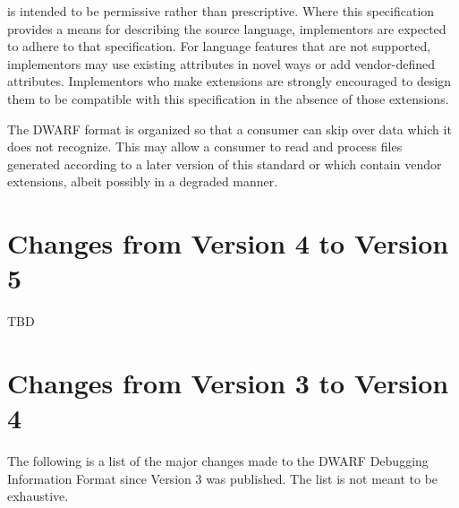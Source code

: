  is intended to be permissive rather than
prescriptive. 
Where this specification provides a means for
describing the source language, implementors are expected
to adhere to that specification. 
For language features that
are not supported, implementors may use existing attributes
in novel ways or add vendor-defined attributes. 
Implementors
who make extensions are strongly encouraged to design them
to be compatible with this specification in the absence of
those extensions.

The DWARF format is organized so that a consumer can skip over
data which it does not recognize. 
This may allow a consumer
to read and process files generated according to a later
version of this standard or which contain vendor extensions,
albeit possibly in a degraded manner.


\section[Changes Version 4 to 5]{Changes from Version 4 to Version 5}
TBD
\section[Changes Version 3 to 4]{Changes from Version 3 to Version 4}
The following is a list of the major changes made to the DWARF Debugging Information
Format since Version 3 was published. The list is not meant to be exhaustive.


